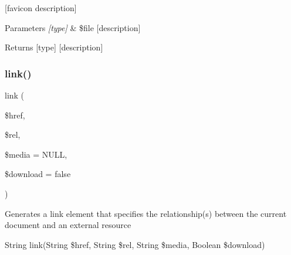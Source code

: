 \mbox{[}favicon description\mbox{]}


\begin{DoxyParams}{Parameters}
{\em \mbox{[}type\mbox{]}} & \$file \mbox{[}description\mbox{]} \\
\hline
\end{DoxyParams}
\begin{DoxyReturn}{Returns}
\mbox{[}type\mbox{]} \mbox{[}description\mbox{]} 
\end{DoxyReturn}
\mbox{\label{class_w_a_f_f_l_e_1_1_framework_1_1_engines_1_1_h_t_m_l_a7596de1be94a6dc237fa4d435193da8b}} 
\subsubsection{\texorpdfstring{link()}{link()}}
{\footnotesize\ttfamily link (\begin{DoxyParamCaption}\item[{}]{\$href,  }\item[{}]{\$rel,  }\item[{}]{\$media = {\ttfamily NULL},  }\item[{}]{\$download = {\ttfamily false} }\end{DoxyParamCaption})}

Generates a link element that specifies the relationship(s) between the current document and an external resource

String link(String \$href, String \$rel, String \$media, Boolean \$download)


